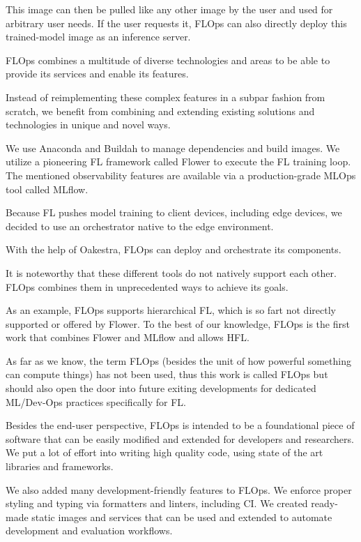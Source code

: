 This image can then be pulled like any other image by the user and used for arbitrary user needs.
If the user requests it, FLOps can also directly deploy this trained-model image as an inference server.

FLOps combines a multitude of diverse technologies and areas
to be able to provide its services and enable its features.

Instead of reimplementing these complex features in a subpar fashion from scratch,
we benefit from combining and extending existing solutions and technologies in unique and novel ways.


We use Anaconda and Buildah to manage dependencies and build images.
We utilize a pioneering FL framework called Flower to execute the FL training loop.
The mentioned observability features are available via a production-grade MLOps tool called MLflow.

Because FL pushes model training to client devices, including edge devices,
we decided to use an orchestrator native to the edge environment.



With the help of Oakestra, FLOps can deploy and orchestrate its components.

It is noteworthy that these different tools do not natively support each other.
FLOps combines them in unprecedented ways to achieve its goals.

As an example, FLOps supports hierarchical FL, which is so fart not directly supported or offered by Flower.
To the best of our knowledge, FLOps is the first work that combines Flower and MLflow and allows HFL.

As far as we know, the term FLOps (besides the unit of how powerful something can compute things)
has not been used, thus this work is called FLOps but should also open the door into future exiting
developments for dedicated ML/Dev-Ops practices specifically for FL.






Besides the end-user perspective, FLOps is intended to be a foundational piece of software
that can be easily modified and extended for developers and researchers.
We put a lot of effort into writing high quality code, using state of the art libraries and frameworks.

We also added many development-friendly features to FLOps.
We enforce proper styling and typing via formatters and linters, including CI.
We created ready-made static images and services that can be used and extended to automate development and evaluation workflows.


